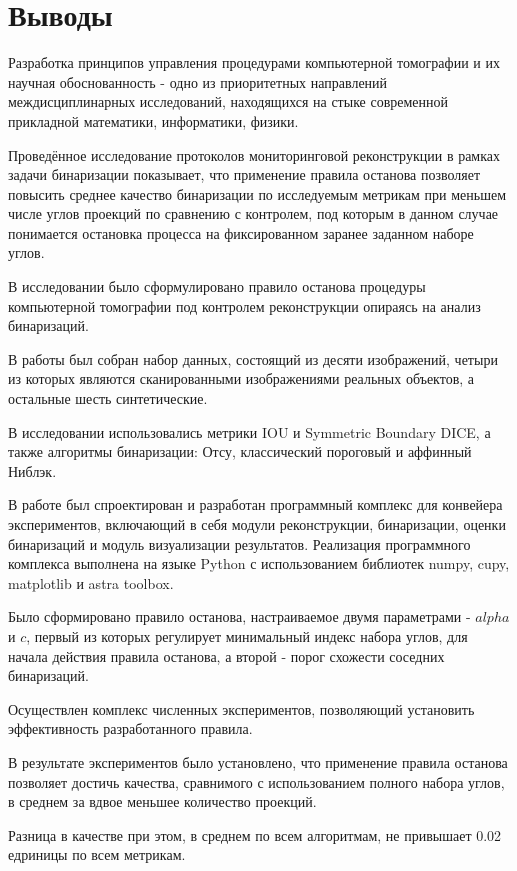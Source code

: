 \section{Выводы}

Разработка принципов управления процедурами компьютерной томографии и их научная обоснованность - одно из приоритетных направлений междисциплинарных исследований, находящихся на стыке современной прикладной математики, информатики, физики.  

Проведённое исследование протоколов мониторинговой реконструкции в рамках задачи бинаризации показывает, что применение правила останова позволяет повысить среднее качество бинаризации по исследуемым метрикам при меньшем числе углов проекций по сравнению с контролем, под которым в данном случае понимается остановка процесса на фиксированном заранее заданном наборе углов.~

В исследовании было сформулировано правило останова процедуры компьютерной томографии под контролем реконструкции опираясь на анализ бинаризаций. 

В работы был собран набор данных, состоящий из десяти изображений, четыри из которых являются сканированными изображениями реальных объектов, а остальные шесть синтетические.

В исследовании использовались метрики IOU и Symmetric Boundary DICE, а также алгоритмы бинаризации: Отсу, классический пороговый и аффинный Ниблэк.

В работе был спроектирован и разработан программный комплекс для конвейера экспериментов, включающий в себя модули реконструкции, бинаризации, оценки бинаризаций и модуль визуализации результатов. Реализация программного комплекса выполнена на языке Python с использованием библиотек numpy, cupy, matplotlib и astra toolbox.

Было сформировано правило останова, настраиваемое двумя параметрами - \(alpha\) и \(c\), первый из которых регулирует минимальный индекс набора углов, для начала действия правила останова, а второй - порог схожести соседних бинаризаций.

Осуществлен комплекс численных экспериментов, позволяющий установить эффективность разработанного правила.

В результате экспериментов было установлено, что применение правила останова позволяет достичь качества, сравнимого с использованием полного набора углов, в среднем за вдвое меньшее количество проекций.

Разница в качестве при этом, в среднем по всем алгоритмам, не привышает 0.02 едриницы по всем метрикам.

